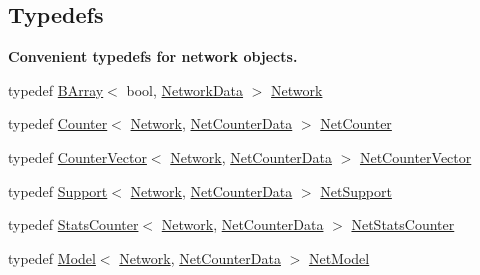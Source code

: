 \subsection*{Typedefs}
\begin{Indent}\textbf{ Convenient typedefs for network objects.}\par
\begin{DoxyCompactItemize}
\item 
typedef \hyperlink{classbarry_1_1_b_array}{B\+Array}$<$ bool, \hyperlink{classbarry_1_1counters_1_1network_1_1_network_data}{Network\+Data} $>$ \hyperlink{namespacebarry_1_1counters_1_1network_a4cb88d4572ded3b447ea269c9cd0b2c0}{Network}
\item 
typedef \hyperlink{classbarry_1_1_counter}{Counter}$<$ \hyperlink{namespacebarry_1_1counters_1_1network_a4cb88d4572ded3b447ea269c9cd0b2c0}{Network}, \hyperlink{classbarry_1_1counters_1_1network_1_1_net_counter_data}{Net\+Counter\+Data} $>$ \hyperlink{namespacebarry_1_1counters_1_1network_a067bd9de04608fc2e1586324d3864a45}{Net\+Counter}
\item 
typedef \hyperlink{classbarry_1_1_counter_vector}{Counter\+Vector}$<$ \hyperlink{namespacebarry_1_1counters_1_1network_a4cb88d4572ded3b447ea269c9cd0b2c0}{Network}, \hyperlink{classbarry_1_1counters_1_1network_1_1_net_counter_data}{Net\+Counter\+Data} $>$ \hyperlink{namespacebarry_1_1counters_1_1network_a3b3c590303d47840d1967372ae495d95}{Net\+Counter\+Vector}
\item 
typedef \hyperlink{classbarry_1_1_support}{Support}$<$ \hyperlink{namespacebarry_1_1counters_1_1network_a4cb88d4572ded3b447ea269c9cd0b2c0}{Network}, \hyperlink{classbarry_1_1counters_1_1network_1_1_net_counter_data}{Net\+Counter\+Data} $>$ \hyperlink{namespacebarry_1_1counters_1_1network_a4d30be7f465efd7d218f0264f8386b32}{Net\+Support}
\item 
typedef \hyperlink{classbarry_1_1_stats_counter}{Stats\+Counter}$<$ \hyperlink{namespacebarry_1_1counters_1_1network_a4cb88d4572ded3b447ea269c9cd0b2c0}{Network}, \hyperlink{classbarry_1_1counters_1_1network_1_1_net_counter_data}{Net\+Counter\+Data} $>$ \hyperlink{namespacebarry_1_1counters_1_1network_ae26c399917113fe280b3f2859376b8b9}{Net\+Stats\+Counter}
\item 
typedef \hyperlink{classbarry_1_1_model}{Model}$<$ \hyperlink{namespacebarry_1_1counters_1_1network_a4cb88d4572ded3b447ea269c9cd0b2c0}{Network}, \hyperlink{classbarry_1_1counters_1_1network_1_1_net_counter_data}{Net\+Counter\+Data} $>$ \hyperlink{namespacebarry_1_1counters_1_1network_a3ab1ee0750d4a5b0f92253874e055358}{Net\+Model}
\end{DoxyCompactItemize}
\end{Indent}
